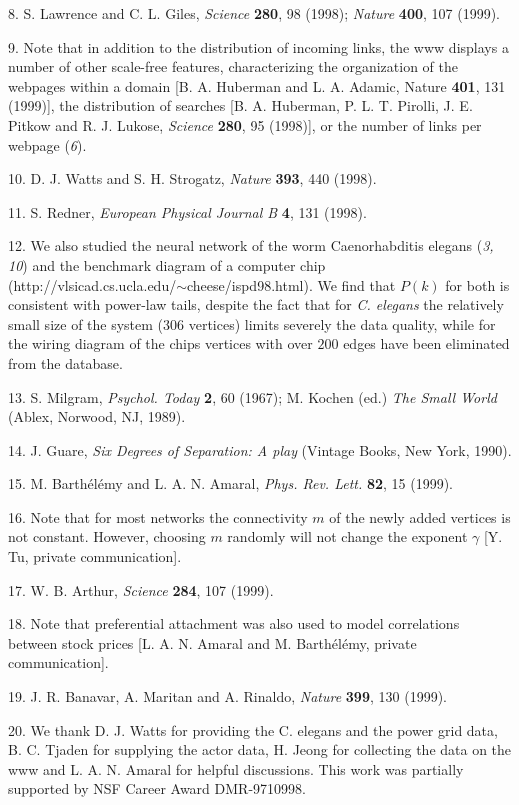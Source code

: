 8. S. Lawrence and C. L. Giles, {\it Science} {\bf 280}, 98 (1998); {\it Nature} {\bf 400}, 107 (1999).

9. Note that in addition to the distribution of incoming links, the www displays a number of other scale-free features, characterizing the organization of the webpages within a domain [B. A. Huberman and L. A. Adamic, Nature {\bf 401}, 131 (1999)], the distribution of searches [B. A. Huberman, P. L. T. Pirolli, J. E. Pitkow and R. J. Lukose, {\it Science} {\bf 280}, 95 (1998)], or the number of links per webpage ({\it 6}).

10. D. J. Watts and S. H. Strogatz, {\it Nature} {\bf 393}, 440 (1998).

11. S. Redner, {\it European Physical Journal B} {\bf 4}, 131 (1998).

12. We also studied the neural network of the worm Caenorhabditis elegans ({\it 3, 10}) and the benchmark diagram of a computer chip\\
(http://vlsicad.cs.ucla.edu/$\sim$cheese/ispd98.html). We find that $P(k)$ for both is consistent with power-law tails, despite the fact that for {\it C. elegans} the relatively small size of the system ($306$ vertices) limits severely the data quality, while for the wiring diagram of the chips vertices with over $200$ edges have been eliminated from the database.

13. S. Milgram, {\it Psychol. Today} {\bf 2}, 60 (1967); M. Kochen (ed.) {\it The Small World} (Ablex, Norwood, NJ, 1989).

14. J. Guare, {\it Six Degrees of Separation: A play} (Vintage Books, New York, 1990).

15. M. Barth\'el\'emy and L. A. N. Amaral, {\it Phys. Rev. Lett.} {\bf 82},   15 (1999).

16. Note that for most networks the connectivity $m$ of the newly added vertices is not constant. However, choosing $m$ randomly will not change the exponent $\gamma$ [Y. Tu, private communication].

17. W. B. Arthur, {\it Science} {\bf 284}, 107 (1999).

18. Note that preferential attachment was also used to model correlations between stock prices [L. A. N. Amaral and M. Barth\'el\'emy, private communication].

19. J. R. Banavar, A. Maritan and A. Rinaldo, {\it Nature} {\bf 399}, 130 (1999).

20. We thank D. J. Watts for providing the C. elegans and the power grid data, B. C. Tjaden for supplying the actor data, H. Jeong for collecting the data on the www and L. A. N. Amaral for helpful discussions. This work was partially supported by NSF Career Award DMR-9710998.



